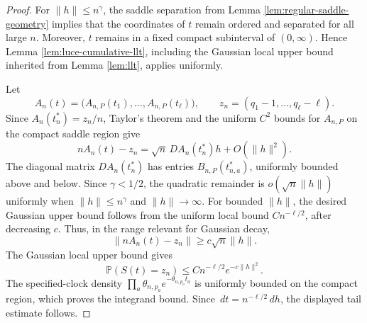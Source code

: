 \documentclass[11pt]{article}
\theoremstyle{remark}
\newcommand{\Pp}{\mathbb P}
\newcommand{\dd}{\,d}
\begin{document}
\begin{proof}
For \(\|h\|\le n^\gamma\), the saddle separation from Lemma \ref{lem:regular-saddle-geometry} implies that the coordinates of \(t\) remain ordered and separated for all large \(n\).  Moreover, \(t\) remains in a fixed compact subinterval of \((0,\infty)\).  Hence Lemma \ref{lem:luce-cumulative-llt}, including the Gaussian local upper bound inherited from Lemma \ref{lem:llt}, applies uniformly.

Let
\[
        A_n(t)=\bigl(A_{n,P}(t_1),\ldots,A_{n,P}(t_\ell)\bigr),
        \qquad z_n=(q_1-1,\ldots,q_\ell-\ell).
\]
Since \(A_n(t_n^*)=z_n/n\), Taylor's theorem and the uniform \(C^2\) bounds for \(A_{n,P}\) on the compact saddle region give
\[
        nA_n(t)-z_n
        =\sqrt n\,DA_n(t_n^*)h+O(\|h\|^2).
\]
The diagonal matrix \(DA_n(t_n^*)\) has entries \(B_{n,P}(t_{n,a}^*)\), uniformly bounded above and below.  Since \(\gamma<1/2\), the quadratic remainder is \(o(\sqrt n\|h\|)\) uniformly when \(\|h\|\le n^\gamma\) and \(\|h\|\to\infty\).  For bounded \(\|h\|\), the desired Gaussian upper bound follows from the uniform local bound \(C n^{-\ell/2}\), after decreasing \(c\).  Thus, in the range relevant for Gaussian decay,
\[
        \|nA_n(t)-z_n\|\ge c\sqrt n\|h\|.
\]
The Gaussian local upper bound gives
\[
        \Pp(S(t)=z_n)\le C n^{-\ell/2}e^{-c\|h\|^2}.
\]
The specified-clock density \(\prod_a\theta_{n,p_a}e^{-\theta_{n,p_a}t_a}\) is uniformly bounded on the compact region, which proves the integrand bound.  Since \(\dd t=n^{-\ell/2}\dd h\), the displayed tail estimate follows.
\end{proof}
\end{document}
